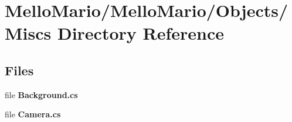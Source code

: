 \section{Mello\+Mario/\+Mello\+Mario/\+Objects/\+Miscs Directory Reference}
\label{dir_83c6dc74d35729687613637802e9e7c6}
\subsection*{Files}
\begin{DoxyCompactItemize}
\item 
file \textbf{ Background.\+cs}
\item 
file \textbf{ Camera.\+cs}
\end{DoxyCompactItemize}
